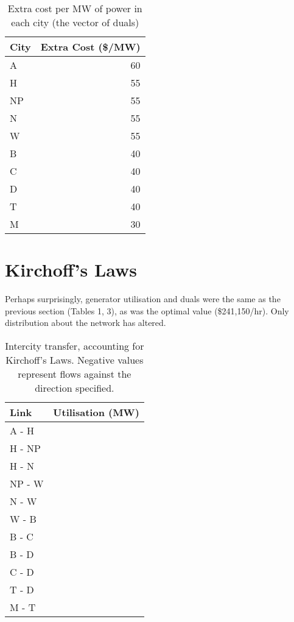 \documentclass[11pt]{article}
\begin{document}
\begin{table}[h]
	\centering
	\begin{tabular}{@{}lr@{}}
	\toprule
	City & Extra Cost (\$/MW) \\ \midrule
	A       & 60             \\
	H       & 55               \\
	NP      & 55              \\
	N       & 55             \\
	W       & 55              \\
	B       & 40                \\
	C       & 40             \\
	D       & 40              \\
	T       & 40              \\
	M       & 30              \\ \bottomrule
	\end{tabular}
	\caption{Extra cost per MW of power in each city (the vector of duals)}
\end{table}

\section*{Kirchoff's Laws}
Perhaps surprisingly, generator utilisation and duals were the same as the previous section (Tables 1, 3), as was the optimal value (\$241,150/hr). Only distribution about the network has altered.

\begin{table}[h]
	\centering
	\begin{tabular}{@{}lr@{}}
	\toprule
	Link & Utilisation (MW) \\ \midrule
	A - H       & \color{red}{$-500$}        \\
	H - NP      & \color{red}{$-280$}        \\
	H - N       & \color{ForestGreen}{$143$} \\
	NP - W      & \color{red}{$-4$}          \\
	N - W       & \color{red}{$-141$}        \\
	W - B       & \color{red}{$-1000$}       \\
	B - C       & \color{ForestGreen}{$292.17$}   \\
	B - D       & \color{red}{$-22.2$}              \\
	C - D       & \color{red}{$-785.8$}              \\
	T - D       & \color{red}{$-233$}              \\
	M - T       & \color{red}{$-850$}              \\ \bottomrule
	\end{tabular}
	\caption{Intercity transfer, accounting for Kirchoff's Laws. Negative values represent flows against the direction specified.}
\end{table}
\end{document}
